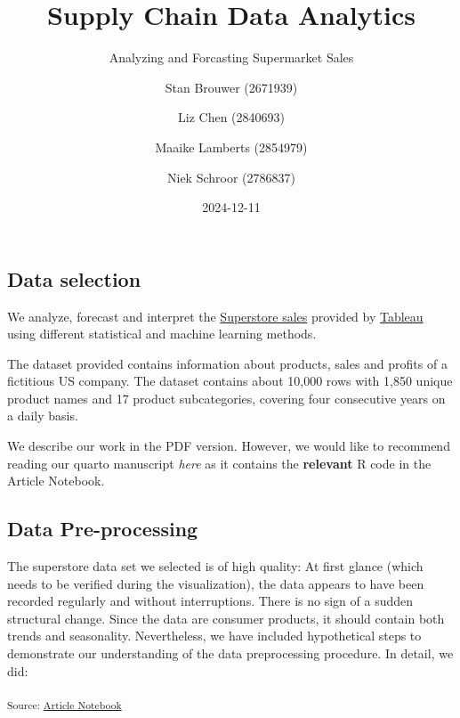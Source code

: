 \documentclass[
  letterpaper,
  DIV=11,
  numbers=noendperiod,
  oneside]{scrartcl}
\title{Supply Chain Data Analytics}
\subtitle{Analyzing and Forcasting Supermarket Sales}
\author{Stan Brouwer (2671939) \and Liz Chen (2840693) \and Maaike
Lamberts (2854979) \and Niek Schroor (2786837)}
\date{2024-12-11}
\begin{document}
\maketitle



\subsection{Data selection}\label{data-selection}

We analyze, forecast and interpret the
\href{https://public.tableau.com/app/sample-data/sample_-_superstore.xls}{Superstore
sales} provided by
\href{https://public.tableau.com/app/learn/sample-data}{Tableau} using
different statistical and machine learning methods.

The dataset provided contains information about products, sales and
profits of a fictitious US company. The dataset contains about 10,000
rows with 1,850 unique product names and 17 product subcategories,
covering four consecutive years on a daily basis.

We describe our work in the PDF version. However, we would like to
recommend reading our quarto manuscript \emph{here} as it contains the
\textbf{relevant} R code in the Article Notebook.

\subsection{Data Pre-processing}\label{data-pre-processing}

The superstore data set we selected is of high quality: At first glance
(which needs to be verified during the visualization), the data appears
to have been recorded regularly and without interruptions. There is no
sign of a sudden structural change. Since the data are consumer
products, it should contain both trends and seasonality. Nevertheless,
we have included hypothetical steps to demonstrate our understanding of
the data preprocessing procedure. In detail, we did:

\textsubscript{Source:
\href{https://SJbrou.github.io/Supply_Chain_Data_Analysis/index.qmd.html}{Article
Notebook}}
\end{document}
